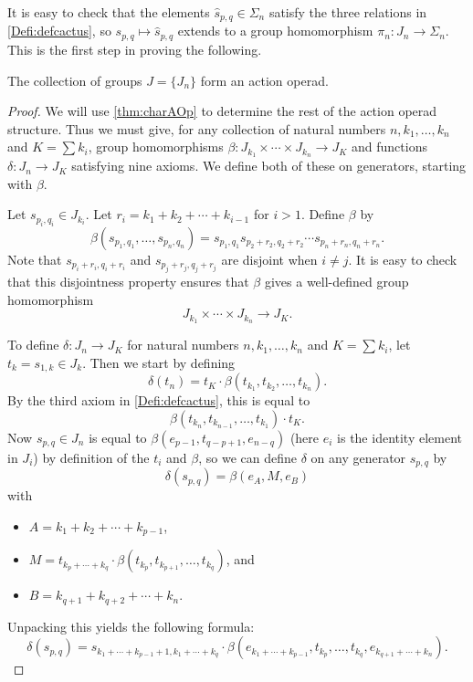 It is easy to check that the elements $\hat{s}_{p,q} \in \Sigma_{n}$ satisfy the three relations in \cref{Defi:defcactus}, so $s_{p,q} \mapsto \hat{s}_{p,q}$ extends to a group homomorphism $\pi_{n} \colon J_{n} \rightarrow \Sigma_{n}$. This is the first step in proving the following.

\begin{thm}\label{thm:J_aop}
The collection of groups $J = \{ J_{n} \}$ form an action operad.
\end{thm}
\begin{proof}
We will use \cref{thm:charAOp} to determine the rest of the action operad structure. Thus we must give, for any collection of natural numbers $n, k_{1}, \ldots, k_{n}$ and $K = \sum k_{i}$, group homomorphisms $\beta \colon J_{k_{1}} \times \cdots \times J_{k_{n}} \rightarrow J_{K}$ and functions $\delta \colon J_{n} \rightarrow J_{K}$ satisfying nine axioms. We define both of these on generators, starting with $\beta$.

Let $s_{p_{i}, q_{i}} \in J_{k_{i}}$. Let $r_{i} = k_{1} + k_{2} + \cdots + k_{i-1}$ for $i > 1$. Define $\beta$ by
  \[
    \beta(s_{p_{1}, q_{1}}, \ldots, s_{p_{n}, q_{n}}) = s_{p_{1}, q_{1}} s_{p_{2}+r_{2}, q_{2}+r_{2}} \cdots s_{p_{n}+r_{n}, q_{n}+r_{n}}.
  \]
Note that $s_{p_{i}+r_{i}, q_{i}+r_{i}}$ and $s_{p_{j}+r_{j}, q_{j}+r_{j}}$ are disjoint when $i \neq j$.
It is easy to check that this disjointness property ensures that $\beta$ gives a well-defined group homomorphism
  \[
    J_{k_{1}} \times \cdots \times J_{k_{n}} \rightarrow J_{K}.
  \]

To define $\delta \colon J_{n} \rightarrow J_{K}$ for natural numbers $n, k_{1}, \ldots, k_{n}$ and $K = \sum k_{i}$, let $t_{k} = s_{1,k} \in J_{k}$. Then we start by defining
  \[
    \delta(t_{n}) = t_{K} \cdot \beta(t_{k_{1}}, t_{k_{2}}, \ldots, t_{k_{n}}).
  \]
By the third axiom in \cref{Defi:defcactus}, this is equal to
  \[
    \beta(t_{k_{n}}, t_{k_{n-1}}, \ldots, t_{k_{1}}) \cdot t_{K}.
  \]
Now $s_{p,q} \in J_{n}$ is equal to $\beta(e_{p-1}, t_{q-p+1}, e_{n-q})$ (here $e_{i}$ is the identity element in $J_{i}$) by definition of the $t_{i}$ and $\beta$, so we can define $\delta$ on any generator $s_{p,q}$ by
  \[
    \delta(s_{p,q}) = \beta ( e_{A}, M, e_{B} )
  \]
with
  \begin{itemize}
    \item $A = k_{1} + k_{2} + \cdots + k_{p-1}$,
    \item $M = t_{k_{p}+ \cdots +k_{q}} \cdot \beta(t_{k_{p}}, t_{k_{p+1}}, \ldots, t_{k_{q}})$, and
    \item $B = k_{q+1} + k_{q+2} + \cdots + k_{n}$.
  \end{itemize}
Unpacking this yields the following formula:
  \[
  \delta(s_{p,q}) = s_{k_{1}+\cdots+k_{p-1}+1, k_{1}+\cdots+k_{q}} \cdot \beta(e_{k_{1}+\cdots+k_{p-1}}, t_{k_{p}}, \ldots, t_{k_{q}}, e_{k_{q+1}+\cdots+k_{n}}).
  \]


\end{proof}
